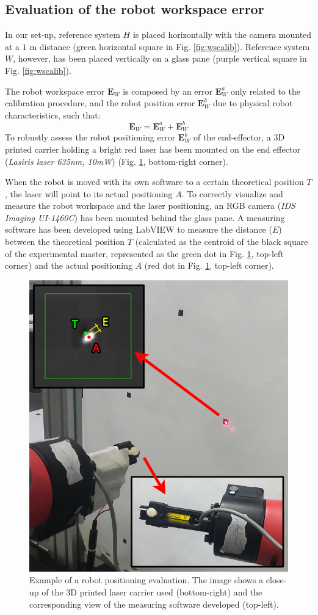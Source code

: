 \documentclass[a4paper, 10 pt, conference]{ieeeconf}      %
\begin{document}
\subsection{Evaluation of the robot workspace error}

In our set-up, reference system $H$ is placed horizontally with the camera mounted at a $1$ m distance (green horizontal square in Fig. \ref{fig:wscalib}). Reference system $W$, however, has been placed vertically on a glass pane (purple vertical square in Fig. \ref{fig:wscalib}).

The robot workspace error $\mathbf{E}_{W}$ is composed by an error $\mathbf{E}^a_{W}$ only related to the calibration procedure, and the robot position error $\mathbf{E}^b_{W}$ due to physical robot characteristics, such that:
\begin{equation}
\mathbf{E}_{W} = \mathbf{E}^a_{W} + \mathbf{E}^b_{W}
\end{equation} 
To robustly assess the robot positioning error $\mathbf{E}^b_{W}$ of the end-effector, a 3D printed carrier holding a bright red laser has been mounted on the end effector (\textit{Lasiris laser 635nm, 10mW}) (Fig. \ref{fig:laser}, bottom-right corner).

When the robot is moved with its own software to a certain theoretical position $T$, the laser will point to its actual positioning $A$. To correctly visualize and measure the robot workspace and the laser positioning, an RGB camera (\textit{IDS Imaging UI-1460C}) has been mounted behind the glass pane.
A measuring software has been developed using LabVIEW to measure the distance ($E$) between the theoretical position $T$ (calculated as the centroid of the black square of the experimental master, represented as the green dot in Fig. \ref{fig:laser}, top-left corner) and the actual positioning $A$ (red dot in Fig. \ref{fig:laser}, top-left corner).

\begin{figure} [ht]
  \centering
  \includegraphics[width=0.7\columnwidth]{figures/lasermount}
  \caption{Example of a robot positioning evaluation. The image shows a close-up of the 3D printed laser carrier used (bottom-right) and the corresponding view of the measuring software developed (top-left).}
  \label{fig:laser}
\end{figure}
\end{document}
